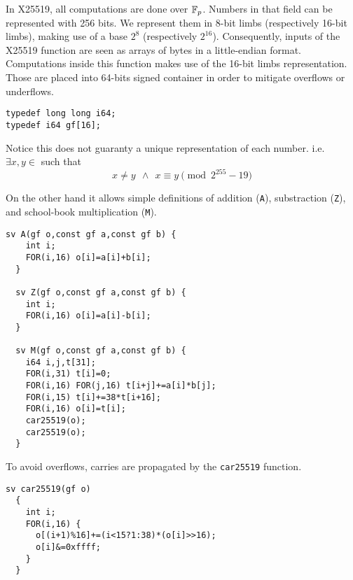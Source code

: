  In X25519, all computations are done over $\mathbb{F}_{p}$.
Numbers in that field can be represented with 256 bits.
We represent them in 8-bit limbs (respectively 16-bit limbs),
making use of a base $2^8$ (respectively $2^{16}$).
Consequently, inputs of the X25519 function are seen as arrays of bytes
in a little-endian format.
Computations inside this function makes use of the 16-bit limbs representation.
Those are placed into 64-bits signed container in order to mitigate overflows or underflows.
\begin{lstlisting}[language=Ctweetnacl]
typedef long long i64;
typedef i64 gf[16];
\end{lstlisting}
Notice this does not guaranty a unique representation of each number. i.e.\\
$\exists x,y \in$  such that
\vspace{-0.25cm}
  $$x \neq y\ \ \land\ \ x \equiv y \pmod{2^{255}-19}$$

On the other hand it allows simple definitions of addition (\texttt{A}),
substraction (\texttt{Z}), and school-book multiplication (\texttt{M}).
  \begin{lstlisting}[language=Ctweetnacl]
  sv A(gf o,const gf a,const gf b) {
    int i;
    FOR(i,16) o[i]=a[i]+b[i];
  }

  sv Z(gf o,const gf a,const gf b) {
    int i;
    FOR(i,16) o[i]=a[i]-b[i];
  }

  sv M(gf o,const gf a,const gf b) {
    i64 i,j,t[31];
    FOR(i,31) t[i]=0;
    FOR(i,16) FOR(j,16) t[i+j]+=a[i]*b[j];
    FOR(i,15) t[i]+=38*t[i+16];
    FOR(i,16) o[i]=t[i];
    car25519(o);
    car25519(o);
  }
  \end{lstlisting}

  To avoid overflows, carries are propagated by the \texttt{car25519} function.
  \begin{lstlisting}[language=Ctweetnacl]
  sv car25519(gf o)
  {
    int i;
    FOR(i,16) {
      o[(i+1)%16]+=(i<15?1:38)*(o[i]>>16);
      o[i]&=0xffff;
    }
  }
  \end{lstlisting}

